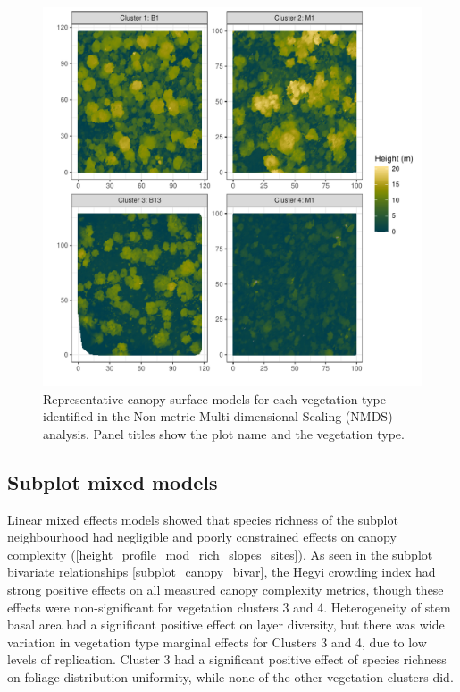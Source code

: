 \documentclass[11pt,a4paper]{article}
\begin{document}
\begin{figure}
	\includegraphics[width=\linewidth]{veg_type_tile}
	\caption{Representative canopy surface models for each vegetation type identified in the Non-metric Multi-dimensional Scaling (NMDS) analysis. Panel titles show the plot name and the vegetation type.}
	\label{veg_type_tile}
\end{figure}

\subsection{Subplot mixed models}

Linear mixed effects models showed that species richness of the subplot neighbourhood had negligible and poorly constrained effects on canopy complexity (\autoref{height_profile_mod_rich_slopes_sites}). As seen in the subplot bivariate relationships \autoref{subplot_canopy_bivar}, the Hegyi crowding index had strong positive effects on all measured canopy complexity metrics, though these effects were non-significant for vegetation clusters 3 and 4. Heterogeneity of stem basal area had a significant positive effect on layer diversity, but there was wide variation in vegetation type marginal effects for Clusters 3 and 4, due to low levels of replication. Cluster 3 had a significant positive effect of species richness on foliage distribution uniformity, while none of the other vegetation clusters did.
\end{document}

